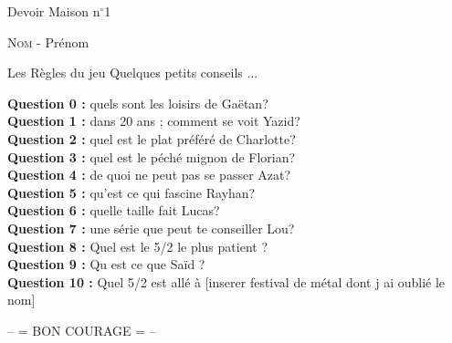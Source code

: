 \documentclass[utf8,a4paper,french,12pt,fleqn]{article}
\newenvironment{Zapf}  {\fontfamily{pzc}\selectfont}{} %
\begin{document}
\begin{center}
\begin{Huge}
Devoir Maison $\text{n}^{\circ}$1 \\
\end{Huge}

\hspace{1cm}

\begin{Large}
\textsc{Nom} - Prénom
\end{Large}
\end{center}

\hspace{3cm}

\begin{bclogo}[logo=\bcbook]{Les Règles du jeu}
Quelques petits conseils ...
\end{bclogo}

\hspace{3cm}	 {\large \textbf{Question 0 :}} quels sont les loisirs de  Gaëtan? \\
\hspace{2cm} {\large \textbf{Question 1 :}} dans 20 ans ; comment se voit  Yazid? \\
\hspace{2cm} {\large \textbf{Question 2 :}} quel est le plat préféré de  Charlotte? \\
\hspace{2cm} {\large \textbf{Question 3 :}} quel est le péché mignon de  Florian? \\
\hspace{2cm} {\large \textbf{Question 4 :}} de quoi ne peut pas se passer Azat? \\
\hspace{2cm} {\large \textbf{Question 5 :}} qu'est ce qui fascine Rayhan? \\
\hspace{2cm} {\large \textbf{Question 6 :}} quelle taille fait Lucas? \\
\hspace{2cm} {\large \textbf{Question 7 :}} une série que peut te conseiller  Lou? \\
\hspace{2cm} {\large \textbf{Question 8 :}} Quel est le 5/2 le plus patient ? \\
\hspace{2cm} {\large \textbf{Question 9 :}} Qu est ce que Saïd ? \\
\hspace{2cm} {\large \textbf{Question 10 :}} Quel 5/2 est allé à [inserer festival de métal dont j ai oublié le nom] \\
\hspace{2cm} \hspace{7cm}

		\begin{Zapf} \noindent \centerline{\fontsize{22}{22}\selectfont -- = BON COURAGE = -- } \end{Zapf}
\end{document}
